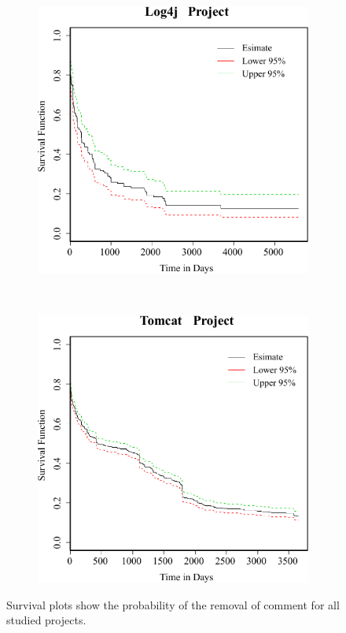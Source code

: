 \begin{figure}[t]
	
	\begin{subfigure}[b]{0.31\textwidth}
		\includegraphics[width=\textwidth]{sur_log4j.pdf}
	\end{subfigure}
	~
	~
	\begin{subfigure}[b]{0.31\textwidth}
		\includegraphics[width=\textwidth]{sur_tomcat.pdf}
	\end{subfigure}
	\caption{Survival plots show the probability of the removal of \SATD comment for all studied projects.}
	\label{fig:survival_plots}
\end{figure}


